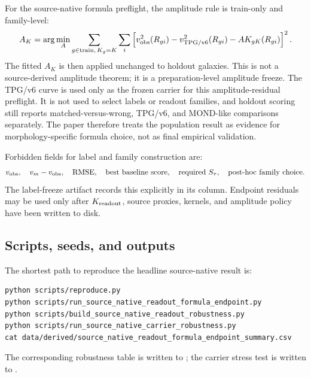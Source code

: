 \documentclass[11pt]{article}
\begin{document}
For the source-native formula preflight, the amplitude rule is train-only and
family-level:
\[
A_K
=
\arg\min_A
\sum_{g\in{\rm train},\,K_g=K}
\sum_i
\left[
v_{\rm obs}^2(R_{gi})-v_{\rm TPG/v6}^2(R_{gi})
-A K_{gK}(R_{gi})
\right]^2 .
\]
The fitted \(A_K\) is then applied unchanged to holdout galaxies.  This is not
a source-derived amplitude theorem; it is a preparation-level amplitude freeze.
The TPG/v6 curve is used only as the frozen carrier for this amplitude-residual
preflight.  It is not used to select labels or readout families, and holdout
scoring still reports matched-versus-wrong, TPG/v6, and MOND-like comparisons
separately.
The paper therefore treats the population result as evidence for
morphology-specific formula choice, not as final empirical validation.

Forbidden fields for label and family construction are:
\[
v_{\rm obs},\quad
v_m-v_{\rm obs},\quad
{\rm RMSE},\quad
\hbox{best baseline score},\quad
\hbox{required }S_\tau,\quad
\hbox{post-hoc family choice}.
\]
The label-freeze artifact records this explicitly in its
 column.  Endpoint residuals may be used only after
\(K_{\rm readout}\), source proxies, kernels, and amplitude policy have been
written to disk.

\subsection{Scripts, seeds, and outputs}

The shortest path to reproduce the headline source-native result is:
\begin{verbatim}
python scripts/reproduce.py
python scripts/run_source_native_readout_formula_endpoint.py
python scripts/build_source_native_readout_robustness.py
python scripts/run_source_native_carrier_robustness.py
cat data/derived/source_native_readout_formula_endpoint_summary.csv
\end{verbatim}
The corresponding robustness table is written to
; the
carrier stress test is written to
.
\end{document}
